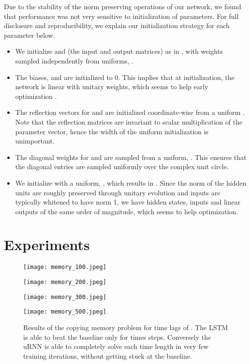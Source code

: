 \documentclass{article}
\begin{document}
Due to the stability of the norm preserving operations of our network, we found that performance was
not very sensitive to initialization of parameters.
For full disclosure and reproducibility, we explain our initialization strategy for each parameter below.
\vspace{-0.25mm}
\begin{itemize}
  \item We initialize  and  (the input and output matrices) as in \cite{Glorotinit},
  with weights sampled independently from uniforms, .
  \item The biases,  and  are initialized to 0. This implies that at initialization, 
    the network is linear with unitary weights, which seems to help early optimization \citep{Saxe2014}.
  \item The reflection vectors for  and  are initialized coordinate-wise from a 
  uniform . Note that the reflection matrices are invariant to scalar multiplication 
  of the parameter vector, hence the width of the uniform initialization is unimportant.
  \item The diagonal weights for  and  are sampled 
  from a uniform, . This ensures that the diagonal entries 
  are sampled uniformly over the complex unit circle.
  \item We initialize  with a uniform, 
  , 
  which results in . Since the norm of the hidden units are roughly 
  preserved through unitary evolution and inputs are typically whitened to have norm 1, 
  we have hidden states, inputs and linear outputs of the same order of magnitude, which seems to
  help optimization.
\end{itemize}

\section{Experiments}
\label{expts}

\begin{figure*}[t!]
  \centering
  \begin{minipage}[b]{0.5\linewidth}
    \centering
    \texttt{[image: memory\_100.jpeg]}
  \end{minipage}\begin{minipage}[b]{0.5\linewidth}
    \centering
    \texttt{[image: memory\_200.jpeg]}
  \end{minipage} 
  \begin{minipage}[b]{0.5\linewidth}
    \centering
    \texttt{[image: memory\_300.jpeg]}
  \end{minipage}\begin{minipage}[b]{0.5\linewidth}
    \centering
    \texttt{[image: memory\_500.jpeg]}
  \end{minipage} 
  \caption{Results of the copying memory problem for time lags of . 
   The LSTM is able to beat the baseline only for  times steps. Conversely the uRNN 
    is able to completely solve each time length in very few training iterations,
    without getting stuck at the baseline.}
  \label{fig1} 
\end{figure*}
\end{document}

